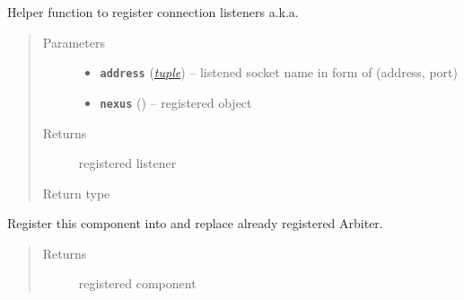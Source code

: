 \documentclass[letterpaper,10pt,english]{sphinxmanual}
\begin{document}
\begin{fulllineitems}
\begin{fulllineitems}
\end{fulllineitems}


\begin{fulllineitems}
\label{util/pox_extension:escape.util.pox_extension.ExtendedOFConnectionArbiter.add_connection_listener}
Helper function to register connection listeners a.k.a.
\begin{quote}\begin{description}
\item[{Parameters}] \leavevmode\begin{itemize}
\item {} 
\textbf{\texttt{address}} (\href{https://docs.python.org/2.7/library/functions.html\#tuple}{\emph{tuple}}) -- listened socket name in form of (address, port)

\item {} 
\textbf{\texttt{nexus}} ({\hyperref[util/pox_extension:escape.util.pox_extension.OpenFlowBridge]{\emph{}}}) -- registered object

\end{itemize}

\item[{Returns}] \leavevmode
registered listener

\item[{Return type}] \leavevmode
{\hyperref[util/pox_extension:escape.util.pox_extension.OpenFlowBridge]{\emph{}}}

\end{description}\end{quote}

\end{fulllineitems}


\begin{fulllineitems}
\label{util/pox_extension:escape.util.pox_extension.ExtendedOFConnectionArbiter.activate}
Register this component into  and replace already registered
Arbiter.
\begin{quote}\begin{description}
\item[{Returns}] \leavevmode
registered component


\end{description}
\end{quote}
\end{fulllineitems}
\end{fulllineitems}
\end{document}
